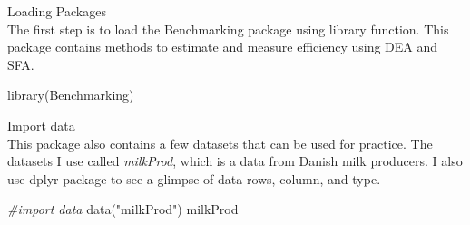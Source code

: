 \documentclass[
]{article}
\newenvironment{Shaded}{\begin{snugshade}}{\end{snugshade}}
\newcommand{\CommentTok}[1]{\textcolor[rgb]{0.56,0.35,0.01}{\textit{#1}}}
\newcommand{\FunctionTok}[1]{\textcolor[rgb]{0.00,0.00,0.00}{#1}}
\newcommand{\NormalTok}[1]{#1}
\newcommand{\StringTok}[1]{\textcolor[rgb]{0.31,0.60,0.02}{#1}}
\begin{document}
Loading Packages\\
The first step is to load the Benchmarking package using library
function. This package contains methods to estimate and measure
efficiency using DEA and SFA.

\begin{Shaded}
\begin{Highlighting}[]
\FunctionTok{library}\NormalTok{(Benchmarking)}
\end{Highlighting}
\end{Shaded}

Import data\\
This package also contains a few datasets that can be used for practice.
The datasets I use called \emph{milkProd}, which is a data from Danish
milk producers. I also use dplyr package to see a glimpse of data rows,
column, and type.

\begin{Shaded}
\begin{Highlighting}[]
\CommentTok{\#import data}
\FunctionTok{data}\NormalTok{(}\StringTok{"milkProd"}\NormalTok{)}
\NormalTok{milkProd}
\end{Highlighting}
\end{Shaded}
\end{document}
